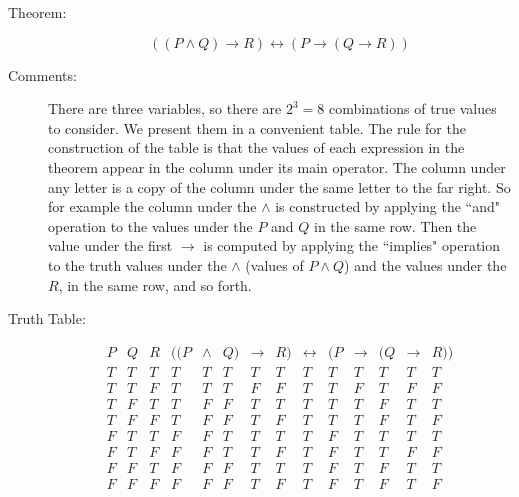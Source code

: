 \documentclass[12pt]{article}
\begin{document}
\begin{description}

\item[Theorem:]  $$((P \wedge Q) \rightarrow R)\leftrightarrow (P \rightarrow (Q \rightarrow R))$$

\item[Comments:]  There are three variables, so there are $2^3=8$ combinations of true values to consider.  We present them in a convenient table.
The rule for the construction of the table is that the values of each expression in the theorem appear in the column under its main operator.
The column under any letter is a copy of the column under the same letter to the far right.  So for example the column under the $\wedge$ is constructed by applying the ``and" operation to the values under the $P$ and $Q$ in the same row.  Then the value under the first
$\rightarrow$ is computed by applying the ``implies" operation to the truth values under the $\wedge$ (values of $P \wedge Q$) and the values under the $R$, in the same row, and so forth.

\item[Truth Table:]

$$\begin{array}{ccc|ccccccccccc}

P & Q & R & ((P &  \wedge &  Q) &  \rightarrow &  R) & \leftrightarrow & (P  & \rightarrow & (Q  & \rightarrow  &  R)) \\ \hline
T & T & T &    T  &      T       &  T   &      T            &   T   &       T                &  T  &       T           &  T   &     T              &  T    \\
T & T & F &    T  &      T       &  T   &      F           &   F   &       T                &  T  &       F          &  T   &     F             &  F   \\
T & F & T &    T  &      F       &  F   &      T            &   T   &       T                &  T  &       T           &  F   &     T              &  T    \\
T & F & F &    T  &      F      &  F   &      T            &   F  &       T                &  T  &       T           &  F   &     T              &  F  \\
F & T & T &    F  &      F       &  T   &      T            &   T   &       T                &  F  &       T           &  T   &     T              &  T    \\
F & T & F &    F  &      F      &  T   &      T            &   F   &       T                &  F  &       T           &  T   &     F              &  F   \\
F & F & T &    F  &      F       &  F  &      T            &   T   &       T                &  F  &       T           &  F   &     T              &  T    \\
F & F & F &    F  &      F       &  F  &      T            &   F  &       T                &  F  &       T           &  F  &     T              &  F 
\end{array}$$


\end{description}
\end{document}
